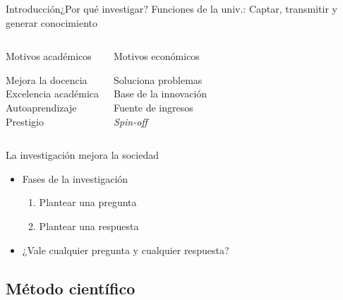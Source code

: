 \documentclass{beamer}
\begin{document}
\begin{frame}{Introducción}{¿Por qué investigar?}
	\centering Funciones de la univ.: \alert{Captar}, \alert{transmitir} y \alert{generar} conocimiento

	\begin{columns}
	\begin{block}{Motivos académicos}
	\begin{center}
		Mejora la docencia\\
		\alert{Excelencia académica}\\
		Autoaprendizaje\\
		Prestigio
	\end{center}
	\end{block}
	\begin{block}{Motivos económicos}
		\begin{center}
		Soluciona problemas\\
		Base de la innovación\\
		\alert{Fuente de ingresos}\\
		\textit{Spin-off}\\
		\end{center}
	\end{block}
	\end{columns}

	\vspace{0.25cm}
	\centering \alert{La investigación mejora la sociedad}

	\begin{itemize}
		\item Fases de la investigación
			\begin{enumerate}
			\item Plantear una pregunta
			\item Plantear una respuesta
			\end{enumerate}
		\item ¿Vale cualquier pregunta y cualquier respuesta?
	\end{itemize}
\end{frame}

\subsection[Método científico]{Método científico}
\end{document}
